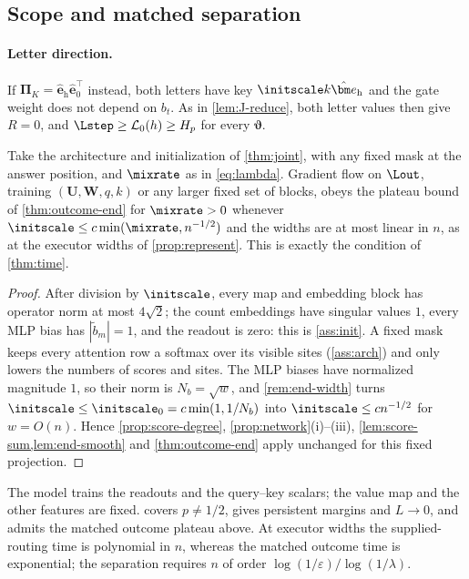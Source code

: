 \subsection{Scope and matched separation}
\label{app:step-learning-scope}
\label{app:weak-routing-limitations}


\paragraph{Letter direction.} If $\bm\Pi_K=\hat{\bm e}_{\mathrm h}\hat{\bm e}_0^\top$ instead, both letters have key $\initscale k\hat{\bm e}_{\mathrm h}$ and the gate weight does not depend on $b_t$.
As in \cref{lem:J-reduce}, both letter values then give $R=0$, and $\Lstep\ge \mathcal L_0(h)\ge H_p$ for every $\bm\vartheta$.

\begin{corollary}
\label{cor:joint-outcome}
Take the architecture and initialization of \cref{thm:joint}, with any fixed mask at the answer position, and $\mixrate$ as in
\cref{eq:lambda}. Gradient flow on $\Lout$, training $(\mathbf U,\mathbf W,q,k)$ or any larger fixed set of blocks, obeys the plateau bound of \cref{thm:outcome-end} for $\mixrate>0$ whenever $\initscale\le c\min(\mixrate,n^{-1/2})$ and the
widths are at most linear in $n$, as at the executor widths of \cref{prop:represent}. This is exactly the condition of \cref{thm:time}.
\end{corollary}

\begin{proof}
After division by $\initscale$, every map and embedding block has operator norm at most $4\sqrt2$; the count embeddings have singular values
$1$, every MLP bias has $|\tilde b_m|=1$, and the readout is zero: this is \cref{ass:init}. A fixed mask keeps every attention row a softmax over
its visible sites (\cref{ass:arch}) and only lowers the numbers of scores and sites. The MLP biases have normalized magnitude $1$, so their norm is $N_b=\sqrt w$, and \cref{rem:end-width} turns
$\initscale\le\initscale_0=c\min(1,1/N_b)$ into $\initscale\le cn^{-1/2}$ for $w=O(n)$. Hence \cref{prop:score-degree}, \cref{prop:network}(i)--(iii),
\cref{lem:score-sum,lem:end-smooth} and \cref{thm:outcome-end} apply unchanged for this fixed projection.
\end{proof}

\begin{remark}\label{rem:joint-scope}
The model trains the readouts and the query--key scalars; the value map and the other features are fixed.
 covers $p\ne1/2$, gives persistent margins and $L\to0$, and admits the matched outcome plateau above.
At executor widths the supplied-routing time is polynomial in $n$, whereas the matched outcome
time is exponential; the separation requires $n$ of order $\log(1/\varepsilon)/\log(1/\lambda)$.
\end{remark}

